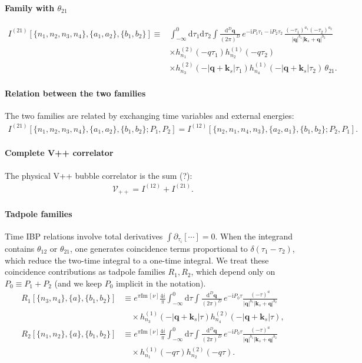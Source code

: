 \documentclass[a4paper]{article}
\newcommand{\FR}[2]{\displaystyle\frac{\,{#1}\,}{#2}}
\def\di{{\mathrm{d}}}
\def\mb{\mathbf}
\def\pd{\partial}
\def\ii{\mathrm{i}}
\def\Im{\mathrm{Im}\,}
\begin{document}
\paragraph{Family with $\theta_{21}$}
\begin{align}
	I^{(21)}[\{n_1,n_2,n_3,n_4\},\{a_1,a_2\},\{b_1,b_2\}] \equiv & \int_{-\infty}^0 \di\tau_1\di\tau_2 \int \FR{\di^D \mb q}{(2\pi)^D}\, e^{-\ii P_1\tau_1 - \ii P_2 \tau_2}\,
	\frac{(-\tau_1)^{a_1}(-\tau_2)^{a_2}}{|\mb q|^{b_1}|\mb k_s+\mb q|^{b_2}} \nonumber \\
	& \times h_{n_1}^{(2)}(-q\tau_1)h_{n_2}^{(1)}(-q\tau_2)\nonumber\\
	& \times h_{n_3}^{(2)}(-|\mb q+\mb k_s|\tau_1)h_{n_4}^{(1)}(-|\mb q+\mb k_s|\tau_2)\,\theta_{21}.
\end{align}

\paragraph{Relation between the two families}
The two families are related by exchanging time variables and external energies:
\begin{align}
	I^{(21)}[\{n_1,n_2,n_3,n_4\},\{a_1,a_2\},\{b_1,b_2\}; P_1,P_2] = I^{(12)}[\{n_2,n_1,n_4,n_3\},\{a_2,a_1\},\{b_1,b_2\}; P_2,P_1].
\end{align}

\paragraph{Complete V++ correlator}
The physical V++ bubble correlator is the sum (?):
\begin{align}
	\mathcal{V}_{++} = I^{(12)} + I^{(21)}.
\end{align}

\paragraph{Tadpole families} Time IBP relations involve total derivatives $\int \pd_{\tau_i}[\cdots]=0$. When the integrand contains $\theta_{12}$ or $\theta_{21}$, one generates coincidence terms proportional to $\delta(\tau_1-\tau_2)$, which reduce the two-time integral to a one-time integral. We treat these coincidence contributions as tadpole families $R_1,R_2$, which depend only on $P_0\equiv P_1+P_2$ (and we keep $P_0$ implicit in the notation).
\begin{align}
	R_1[\{n_3,n_4\},\{a\},\{b_1,b_2\}] & \equiv e^{\pi \Im [\nu]}\frac{4i}{\pi}\int_{-\infty}^0 \di\tau \int \FR{\di^D \mb q}{(2\pi)^D}\, e^{-\ii P_0\tau} \frac{(-\tau)^{a}}{|\mb q|^{b_1}|\mb k_s+\mb q|^{b_2}} \nonumber \\
	 & \quad\times h_{n_3}^{(1)}(-|\mb q+\mb k_s|\tau)h_{n_4}^{(2)}(-|\mb q+\mb k_s|\tau),                                                     \\
	R_2[\{n_1,n_2\},\{a\},\{b_1,b_2\}] & \equiv e^{\pi \Im [\nu]}\frac{4i}{\pi}\int_{-\infty}^0 \di\tau \int \FR{\di^D \mb q}{(2\pi)^D}\, e^{-\ii P_0\tau} \frac{(-\tau)^{a}}{|\mb q|^{b_1}|\mb k_s+\mb q|^{b_2}} \nonumber \\
	   & \quad\times h_{n_1}^{(1)}(-q\tau)h_{n_2}^{(2)}(-q\tau).
\end{align}
\end{document}
